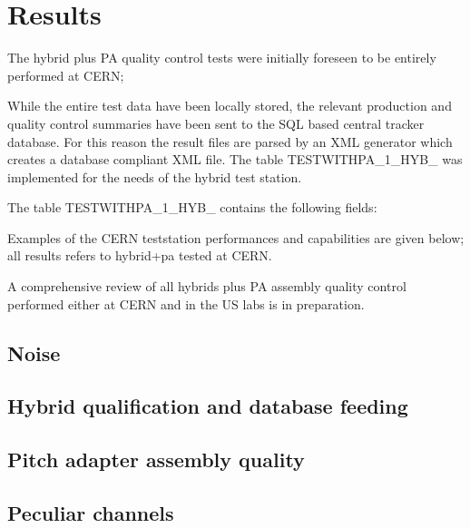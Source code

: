 \section{Results}

The hybrid plus PA quality control tests were initially foreseen to be entirely performed at CERN;


While the entire test data have been locally stored, the relevant production and quality control summaries have been sent to the SQL based central tracker database. For this reason the result files are parsed by an XML generator which creates a database compliant XML file. The table TESTWITHPA\_1\_HYB\_ was implemented for the needs of the hybrid test station.

The table TESTWITHPA\_1\_HYB\_ contains the following fields:


Examples of the CERN teststation performances and capabilities are given below; all results refers to hybrid+pa tested at CERN.

A comprehensive review of all hybrids plus PA assembly quality control  performed either at CERN and in the US labs is in preparation.

\subsection{Noise}


\subsection{Hybrid qualification and database feeding}


\subsection{Pitch adapter assembly quality}


\subsection{Peculiar channels}
